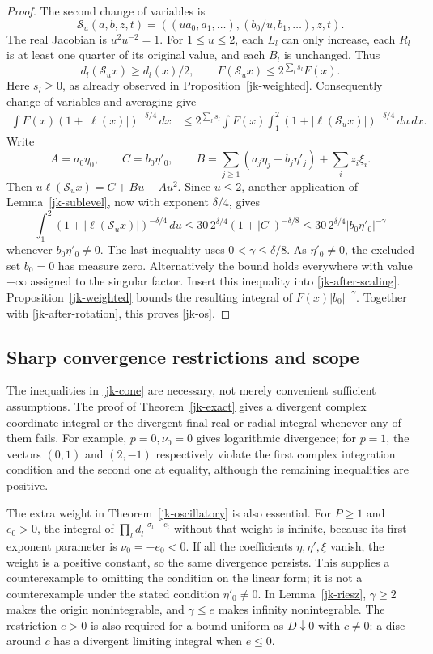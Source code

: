 \begin{proof}
The second change of variables is
\[
 \mathcal S_u(a,b,z,t)=
 ((ua_0,a_1,\ldots),(b_0/u,b_1,\ldots),z,t).
\]
The real Jacobian is \(u^2u^{-2}=1\).
For \(1\leq u\leq2\), each \(L_l\) can only increase,
each \(R_l\) is at least one quarter of its original value,
and each \(B_l\) is unchanged.  Thus
\[
 d_l(\mathcal S_u x)\geq d_l(x)/2,\qquad
 F(\mathcal S_u x)\leq2^{\sum_l s_l}F(x).
\]
Here \(s_l\geq0\), as already observed in
Proposition~\ref{jk-weighted}.
Consequently change of variables and averaging give
\begin{align}
 \int F(x)(1+|\ell(x)|)^{-\delta/4}\,dx
 &\leq2^{\sum_l s_l}
   \int F(x)\int_1^2
       (1+|\ell(\mathcal S_u x)|)^{-\delta/4}\,du\,dx.
 \label{jk-after-scaling}
\end{align}
Write
\[
 A=a_0\eta_0,\qquad C=b_0\eta'_0,\qquad
 B=\sum_{j\geq1}(a_j\eta_j+b_j\eta'_j)+\sum_i z_i\xi_i.
\]
Then \(u\ell(\mathcal S_u x)=C+Bu+Au^2\).
Since \(u\leq2\), another application of
Lemma~\ref{jk-sublevel}, now with exponent \(\delta/4\), gives
\[
 \int_1^2(1+|\ell(\mathcal S_u x)|)^{-\delta/4}\,du
 \leq30\,2^{\delta/4}(1+|C|)^{-\delta/8}
 \leq30\,2^{\delta/4}|b_0\eta'_0|^{-\gamma}
\]
whenever \(b_0\eta'_0\ne0\).
The last inequality uses \(0<\gamma\leq\delta/8\).
As \(\eta'_0\ne0\), the excluded set \(b_0=0\) has measure
zero.  Alternatively the bound holds everywhere with value
\(+\infty\) assigned to the singular factor.
Insert this inequality into \eqref{jk-after-scaling}.
Proposition~\ref{jk-weighted} bounds the resulting integral of
\(F(x)|b_0|^{-\gamma}\).
Together with \eqref{jk-after-rotation}, this proves
\eqref{jk-os}.
\end{proof}

\subsection{Sharp convergence restrictions and scope}

The inequalities in \eqref{jk-cone} are necessary, not merely
convenient sufficient assumptions.  The proof of
Theorem~\ref{jk-exact} gives a divergent complex coordinate integral
or the divergent final real or radial integral whenever any of
them fails.  For example, \(p=0,\nu_0=0\) gives logarithmic
divergence; for \(p=1\), the vectors
\((0,1)\) and \((2,-1)\) respectively violate the first
complex integration condition and the second one at equality,
although the remaining inequalities are positive.

The extra weight in Theorem~\ref{jk-oscillatory} is also essential.
For \(P\geq1\) and \(e_0>0\), the integral of
\(\prod_l d_l^{-\sigma_l+e_l}\) without that weight is infinite,
because its first exponent parameter is \(\nu_0=-e_0<0\).
If all the coefficients \(\eta,\eta',\xi\) vanish, the weight
is a positive constant, so the same divergence persists.
This supplies a counterexample to omitting the condition on the
linear form; it is not a counterexample under the stated
condition \(\eta'_0\ne0\).
In Lemma~\ref{jk-riesz}, \(\gamma\geq2\) makes the origin
nonintegrable, and \(\gamma\leq e\) makes infinity nonintegrable.
The restriction \(e>0\) is also required for a bound uniform
as \(D\downarrow0\) with \(c\ne0\): a disc around \(c\)
has a divergent limiting integral when \(e\leq0\).

